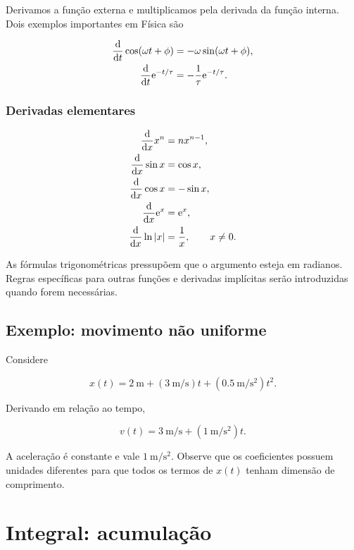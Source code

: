 Derivamos a função externa e multiplicamos pela derivada da função interna. Dois exemplos importantes em Física são

\begin{align}
  \frac{\mathop{}\!\mathrm{d}}{\mathop{}\!\mathrm{d} t}\cos(\omega t+\phi)
    &=-\omega\sin(\omega t+\phi),\\
  \frac{\mathop{}\!\mathrm{d}}{\mathop{}\!\mathrm{d} t}\mathrm{e}^{-t/\tau}
    &=-\frac{1}{\tau}\mathrm{e}^{-t/\tau}.
\end{align}

\subsubsection*{Derivadas elementares}

\begin{align}
  \frac{\dd}{\dd x}x^n &= nx^{n-1},\\
  \frac{\dd}{\dd x}\sin x &= \cos x,\\
  \frac{\dd}{\dd x}\cos x &= -\sin x,\\
  \frac{\dd}{\dd x}\e^x &= \e^x,\\
  \frac{\dd}{\dd x}\ln|x| &= \frac{1}{x},
  \qquad x\neq0.
\end{align}

As fórmulas trigonométricas pressupõem que o argumento esteja em radianos. Regras específicas para outras funções e derivadas implícitas serão introduzidas quando forem necessárias.

\subsection*{Exemplo: movimento não uniforme}

Considere

\begin{equation}
  x(t)=\SI{2}{\meter}
       +\left(\SI{3}{\meter\per\second}\right)t
       +\left(\SI{0.5}{\meter\per\second\squared}\right)t^2.
\end{equation}

Derivando em relação ao tempo,

\begin{equation}
  v(t)=\SI{3}{\meter\per\second}
       +\left(\SI{1}{\meter\per\second\squared}\right)t.
\end{equation}

A aceleração é constante e vale $\SI{1}{\meter\per\second\squared}$. Observe que os coeficientes possuem unidades diferentes para que todos os termos de $x(t)$ tenham dimensão de comprimento.

\section{Integral: acumulação}

